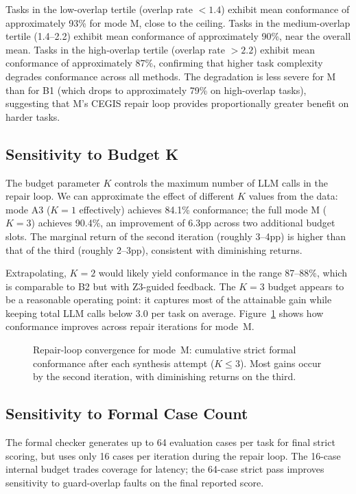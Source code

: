 Tasks in the low-overlap tertile (overlap rate $< 1.4$) exhibit mean conformance of
approximately 93\% for mode M, close to the ceiling.  Tasks in the medium-overlap
tertile (1.4--2.2) exhibit mean conformance of approximately 90\%, near the overall
mean.  Tasks in the high-overlap tertile (overlap rate $> 2.2$) exhibit mean
conformance of approximately 87\%, confirming that higher task complexity degrades
conformance across all methods.  The degradation is less severe for M than for B1
(which drops to approximately 79\% on high-overlap tasks), suggesting that M's
CEGIS repair loop provides proportionally greater benefit on harder tasks.

\subsection{Sensitivity to Budget K}

The budget parameter $K$ controls the maximum number of LLM calls in the repair
loop.  We can approximate the effect of different $K$ values from the data: mode A3
($K=1$ effectively) achieves 84.1\% conformance; the full mode M ($K=3$) achieves
90.4\%, an improvement of 6.3pp across two additional budget slots.  The marginal
return of the second iteration (roughly 3--4pp) is higher than that of the third
(roughly 2--3pp), consistent with diminishing returns.

Extrapolating, $K=2$ would likely yield conformance in the range 87--88\%, which is
comparable to B2 but with Z3-guided feedback.  The $K=3$ budget appears to be a
reasonable operating point: it captures most of the attainable gain while keeping
total LLM calls below 3.0 per task on average.
Figure~\ref{fig:repair-convergence} shows how conformance improves across repair
iterations for mode~M.

\begin{figure}[t]
  \centering
  \caption{Repair-loop convergence for mode~M: cumulative strict formal conformance
    after each synthesis attempt ($K \le 3$).  Most gains occur by the second
    iteration, with diminishing returns on the third.}
  \label{fig:repair-convergence}
\end{figure}

\subsection{Sensitivity to Formal Case Count}

The formal checker generates up to 64 evaluation cases per task for final
strict scoring, but uses only 16 cases per iteration during the repair loop.
The 16-case internal budget trades coverage for latency; the 64-case strict
pass improves sensitivity to guard-overlap faults on the final reported score.


